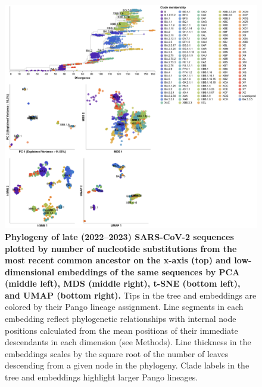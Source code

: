 \begin{figure}[!h]
\includegraphics[width=0.9\columnwidth]{figures/sarscov2-test-embeddings-by-Nextclade_pango_collapsed-clade.png}
\caption{{\bf Phylogeny of late (2022--2023) SARS-CoV-2 sequences plotted by number of nucleotide substitutions from the most recent common ancestor on the x-axis (top) and low-dimensional embeddings of the same sequences by PCA (middle left), MDS (middle right), t-SNE (bottom left), and UMAP (bottom right).}
  Tips in the tree and embeddings are colored by their Pango lineage assignment.
  Line segments in each embedding reflect phylogenetic relationships with internal node positions calculated from the mean positions of their immediate descendants in each dimension (see Methods).
  Line thickness in the embeddings scales by the square root of the number of leaves descending from a given node in the phylogeny.
  Clade labels in the tree and embeddings highlight larger Pango lineages.
}
\label{S_Fig_sarscov2_late_embeddings_by_Pango}
\end{figure}

